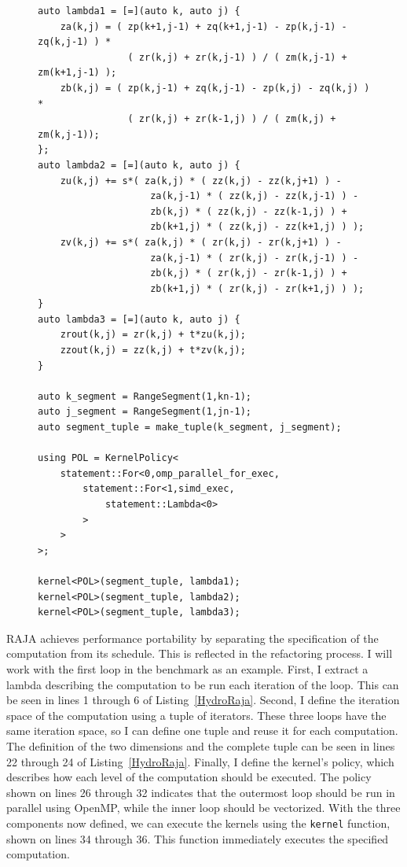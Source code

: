 \documentclass{article}
\begin{document}
\begin{figure}
    \begin{lstlisting}[caption={RAJA implementation of the \texttt{HYDRO\_2D} benchmark},label={HydroRaja}]
auto lambda1 = [=](auto k, auto j) {
    za(k,j) = ( zp(k+1,j-1) + zq(k+1,j-1) - zp(k,j-1) - zq(k,j-1) ) *
                ( zr(k,j) + zr(k,j-1) ) / ( zm(k,j-1) + zm(k+1,j-1) ); 
    zb(k,j) = ( zp(k,j-1) + zq(k,j-1) - zp(k,j) - zq(k,j) ) * 
                ( zr(k,j) + zr(k-1,j) ) / ( zm(k,j) + zm(k,j-1));
};
auto lambda2 = [=](auto k, auto j) {
    zu(k,j) += s*( za(k,j) * ( zz(k,j) - zz(k,j+1) ) - 
                    za(k,j-1) * ( zz(k,j) - zz(k,j-1) ) - 
                    zb(k,j) * ( zz(k,j) - zz(k-1,j) ) + 
                    zb(k+1,j) * ( zz(k,j) - zz(k+1,j) ) ); 
    zv(k,j) += s*( za(k,j) * ( zr(k,j) - zr(k,j+1) ) - 
                    za(k,j-1) * ( zr(k,j) - zr(k,j-1) ) - 
                    zb(k,j) * ( zr(k,j) - zr(k-1,j) ) + 
                    zb(k+1,j) * ( zr(k,j) - zr(k+1,j) ) );
}
auto lambda3 = [=](auto k, auto j) {
    zrout(k,j) = zr(k,j) + t*zu(k,j); 
    zzout(k,j) = zz(k,j) + t*zv(k,j);
}

auto k_segment = RangeSegment(1,kn-1);
auto j_segment = RangeSegment(1,jn-1);
auto segment_tuple = make_tuple(k_segment, j_segment);
    
using POL = KernelPolicy<
    statement::For<0,omp_parallel_for_exec,
        statement::For<1,simd_exec,
            statement::Lambda<0>
        >
    >
>;

kernel<POL>(segment_tuple, lambda1);
kernel<POL>(segment_tuple, lambda2);
kernel<POL>(segment_tuple, lambda3);
\end{lstlisting}
\end{figure}


RAJA achieves performance portability by separating the specification of the computation from its schedule.
This is reflected in the refactoring process.
I will work with the first loop in the benchmark as an example.
First, I extract a lambda describing the computation to be run each iteration of the loop.
This can be seen in lines 1 through 6 of Listing~\ref{HydroRaja}.
Second, I define the iteration space of the computation using a tuple of iterators. 
These three loops have the same iteration space, so I can define one tuple and reuse it for each computation.
The definition of the two dimensions and the complete tuple can be seen in lines 22 through 24 of Listing~\ref{HydroRaja}.
Finally, I define the kernel's policy, which describes how each level of the computation should be executed. 
The policy shown on lines 26 through 32 indicates that the outermost loop should be run in parallel using OpenMP, while the inner loop should be vectorized.
With the three components now defined, we can execute the kernels using the \verb.kernel. function, shown on lines 34 through 36.
This function immediately executes the specified computation.
\end{document}
